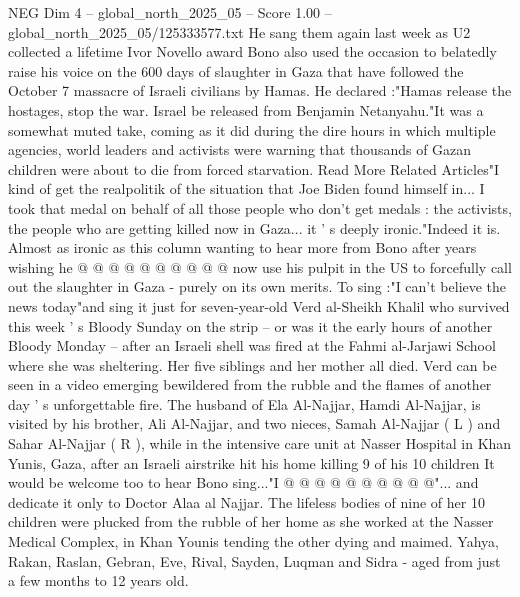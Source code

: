 \begin{textsample}{NEG Dim 4 – global\_north\_2025\_05 – Score 1.00 – global\_north\_2025\_05/125333577.txt}  \label{ex:f4_neg_248}
He sang them again last week as U2 collected a lifetime Ivor Novello award Bono also used the occasion to belatedly raise his voice on the 600 days of slaughter in Gaza that have followed the October 7 massacre of Israeli civilians by Hamas.
He declared :"Hamas release the hostages, stop the war.
Israel be released from Benjamin Netanyahu."It was a somewhat muted take, coming as it did during the dire hours in which multiple agencies, world leaders and activists were warning that thousands of Gazan children were about to die from forced starvation.
Read More Related Articles"I kind of get the realpolitik of the situation that Joe Biden found himself in...
I took that medal on behalf of all those people who don't get medals : the activists, the people who are getting killed now in Gaza... it ' s deeply ironic."Indeed it is.
Almost as ironic as this column wanting to hear more from Bono after years wishing he @ @ @ @ @ @ @ @ @ @ now use his pulpit in the US to forcefully call out the slaughter in Gaza - purely on its own merits.
To sing :"I can't believe the news today"and sing it just for seven-year-old Verd al-Sheikh Khalil who survived this week ' s Bloody Sunday on the strip -- or was it the early hours of another Bloody Monday -- after an Israeli shell was fired at the Fahmi al-Jarjawi School where she was sheltering.
Her five siblings and her mother all died.
Verd can be seen in a video emerging bewildered from the rubble and the flames of another day ' s unforgettable fire.
The husband of Ela Al-Najjar, Hamdi Al-Najjar, is visited by his brother, Ali Al-Najjar, and two nieces, Samah Al-Najjar ( L ) and Sahar Al-Najjar ( R ), while in the intensive care unit at Nasser Hospital in Khan Yunis, Gaza, after an Israeli airstrike hit his home killing 9 of his 10 children It would be welcome too to hear Bono sing..."I @ @ @ @ @ @ @ @ @ @"... and dedicate it only to Doctor Alaa al Najjar.
The lifeless bodies of nine of her 10 children were plucked from the rubble of her home as she worked at the Nasser Medical Complex, in Khan Younis tending the other dying and maimed.
Yahya, Rakan, Raslan, Gebran, Eve, Rival, Sayden, Luqman and Sidra - aged from just a few months to 12 years old.

\end{textsample}
